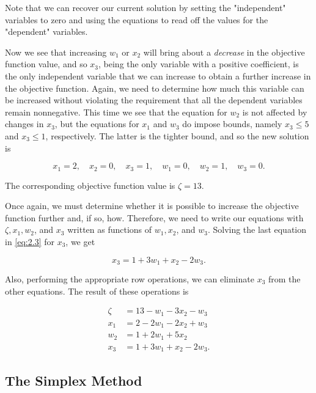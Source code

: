 \documentclass{article}
\begin{document}
    Note that we can recover our current solution by setting the "independent" variables to zero and using the equations to read off the values for the "dependent" variables.
    
    Now we see that increasing \( w_{1} \) or \( x_{2} \) will bring about a \emph{decrease} in the objective function value, and so \( x_{3} \), being the only variable with a positive coefficient, is the only independent variable that we can increase to obtain a further increase in the objective function. Again, we need to determine how much this variable can be increased without violating the requirement that all the dependent variables remain nonnegative. This time we see that the equation for \( w_{2} \) is not affected by changes in \( x_{3} \), but the equations for \( x_{1} \) and \( w_{3} \) do impose bounds, namely \( x_{3}\leq 5 \) and \( x_{3}\leq 1 \), respectively. The latter is the tighter bound, and so the new solution is
    
    \[ x_{1}=2,\quad x_{2}=0,\quad x_{3}=1,\quad w_{1}=0,\quad w_{2}=1,\quad w_{3}=0. \]
    
    The corresponding objective function value is \( \zeta=13 \).
    
    Once again, we must determine whether it is possible to increase the objective function further and, if so, how. Therefore, we need to write our equations with \( \zeta,x_{1},w_{2} \), and \( x_{3} \) written as functions of \( w_{1},x_{2} \), and \( w_{3} \). Solving the last equation in \eqref{eq:2.3} for \( x_{3} \), we get
    
    \[ x_{3}=1+3w_{1}+x_{2}-2w_{3}. \]
    
    Also, performing the appropriate row operations, we can eliminate \( x_{3} \) from the other equations. The result of these operations is
    
    \begin{equation}\label{eq:2.4}
    \begin{split}
    \zeta &= 13 - w_{1} - 3x_{2} - w_{3} \\
    x_{1} &= 2 - 2w_{1} - 2x_{2} + w_{3} \\
    w_{2} &= 1 + 2w_{1} + 5x_{2} \\
    x_{3} &= 1 + 3w_{1} + x_{2} - 2w_{3}.
    \end{split}
    \end{equation}
    
    \subsection{The Simplex Method}
    
\end{document}
